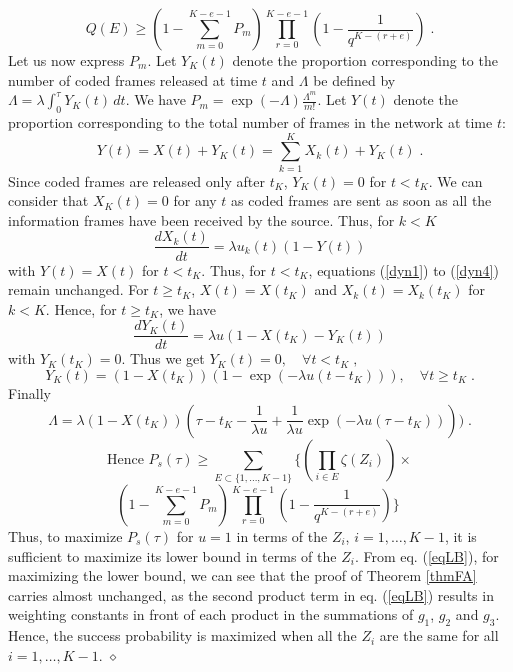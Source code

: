 \documentclass[10pt,twocolumn,conference,final]{IEEEtran}
\def\endpf{\hfill$\diamond$}
\begin{document}
\begin{equation}\label{LBQE}
Q(E)\geq\left(1-\sum_{m=0}^{K-e-1}P_m\right)\prod_{r=0}^{K-e-1}\left(1-\frac{1}{q^{K-(r+e)}}\right)\;.
\end{equation}
Let us now express $P_m$. Let $Y_K(t)$ denote 
the proportion corresponding to
the number of coded frames released at time $t$ and $\Lambda$ be defined by $\Lambda=\lambda\int_0^{\tau}Y_K(t)\,dt$. We have $P_m=\exp(-\Lambda)\frac{\Lambda^m}{m!}$.
Let $Y(t)$ denote the 
proportion corresponding to the
total number of frames in the network at time $t$: 
\[Y(t)=X(t)+Y_K(t)=\sum_{k=1}^K X_k(t)+Y_K(t)\;.\]
Since coded frames are released only after $t_K$, $Y_K(t)=0$ for $t<t_K$. We can consider that $X_K(t)=0$ for any $t$ as coded frames are sent as soon as all the information frames have been received by the source. 
Thus, for $k<K$
\[\frac{dX_k(t)}{dt}=\lambda u_k(t)(1-Y(t))\]
with $Y(t)=X(t)$ for $t<t_K$. 
Thus, for $t<t_K$, equations (\ref{dyn1}) to (\ref{dyn4}) remain unchanged. For $t\geq t_K$, $X(t)=X(t_K)$ and $X_k(t)=X_k(t_K)$ for $k<K$.
Hence, for $t\geq t_K$, we have
\[\frac{dY_K(t)}{dt}=\lambda u (1-X(t_K)-Y_K(t))\]
with $Y_K(t_K)=0$.
Thus we get
\(Y_K(t)=0,\quad \forall t<t_K\;,\)
\[Y_K(t)=(1-X(t_K))(1-\exp(-\lambda u (t-t_K))),\quad \forall t\geq t_K\;.\]
Finally
\[
\Lambda=\lambda (1-X(t_K))(\tau-t_K-\frac{1}{\lambda u}+\frac{1}{\lambda u}\exp(-\lambda u (\tau-t_K))))\;.
\]
\[
\mbox{Hence \ }
P_s(\tau)\geq\sum_{E\subset\{1,\dots,K-1\}}\{\left(
\prod_{i\in E}\zeta(Z_i)\right) \times
\]
\begin{equation}\label{eqLB}
\left(1-\sum_{m=0}^{K-e-1}P_m\right)
\prod_{r=0}^{K-e-1}\left(1-\frac{1}{q^{K-(r+e)}}\right)\}\;
\end{equation}
Thus, to maximize $P_s(\tau)$ for $u=1$ in terms of the $Z_i$, $i=1,\dots,K-1$, it is sufficient to maximize its lower bound in terms of the $Z_i$.
From eq. (\ref{eqLB}), for maximizing the lower bound, we can see that the proof of Theorem \ref{thmFA} carries almost unchanged, as the second product term in eq. (\ref{eqLB}) results in weighting constants in front of each product in the summations of $g_1$, $g_2$ and $g_3$. Hence, the success probability is maximized when all the $Z_i$ are the same for all $i=1,\dots,K-1$.
\endpf
\end{document}
